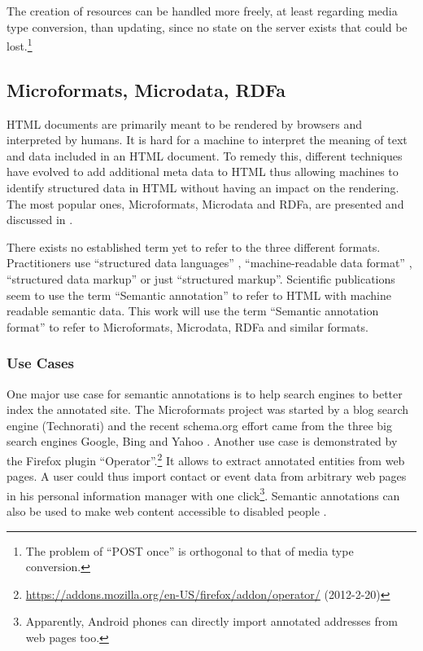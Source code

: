\documentclass[11pt,a4paper,headsepline,twoside]{scrartcl}		%
\newcommand{\citeurl}[2]{\url{#1} (#2)}
\begin{document}
The creation of resources can be handled more freely, at least regarding media
type conversion, than updating, since no state on the server exists that could
be lost.\footnote{The problem of ``POST once'' is orthogonal to that of media
  type conversion.}

\subsection{Microformats, Microdata, RDFa}
\label{sec:microdata}

HTML documents are primarily meant to be rendered by browsers and interpreted by
humans. It is hard for a machine to interpret the meaning of text and data
included in an HTML document. To remedy this, different techniques have evolved to
add additional meta data to HTML thus allowing machines to identify structured
data in HTML without having an impact on the rendering. The most popular ones,
Microformats, Microdata and RDFa, are presented and discussed in
\cite{Tennison2012}.

There exists no established term yet to refer to the three different
formats. Practitioners use ``structured data languages'' \cite{Sporny2011},
``machine-readable data format'' \cite{Hickson2011}, ``structured data
markup'' \cite{Goel2011} or just ``structured markup''. Scientific publications
seem to use the term ``Semantic annotation'' \cite{instance7} to refer to HTML
with machine readable semantic data. This work will use the term ``Semantic
annotation format'' to refer to Microformats, Microdata, RDFa and similar
formats.

\subsubsection{Use Cases}
\label{sec:semantic-anno-use-cases}

One major use case for semantic annotations is to help search engines to better
index the annotated site. The Microformats project was started by a blog search
engine (Technorati) \cite{Celik2006} and the recent schema.org effort came from
the three big search engines Google, Bing and Yahoo \cite{Goel2011}. Another use
case is demonstrated by the Firefox plugin
``Operator''.\footnote{\citeurl{https://addons.mozilla.org/en-US/firefox/addon/operator/}{2012-2-20}}
It allows to extract annotated entities from web pages. A user could thus import
contact or event data from arbitrary web pages in his personal information
manager with one click\footnote{Apparently, Android phones can directly import
  annotated addresses from web pages too.}. Semantic annotations can also be
used to make web content accessible to disabled
people \cite{Yesilada:2007:EDS:1279700.1279704}.
\end{document}

